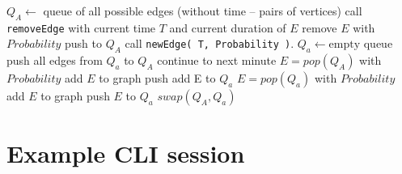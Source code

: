 \documentclass[11pt, a4paper]{article}
\newcommand{\pl}[1]{\texttt{#1}} %
\theoremstyle{plain}
\theoremstyle{definition}
\theoremstyle{remark}
\begin{document}
\begin{algorithmic}[1]
    \State $Q_A \leftarrow$ queue of all possible edges (without time -- pairs of vertices)
            \State call \pl{removeEdge} with current time $T$ and current duration of $E$
            \State remove $E$ with $Probability$
             push to $Q_A$ \EndIf
        \EndFor
        \State call \pl{newEdge( T, Probability )}.
        \State $Q_a \leftarrow \text{empty queue}$
                \State push all edges from $Q_a$ to $Q_A$
                \State continue to next minute
            \EndIf
            \State $E = pop( Q_A )$
            \State with $Probability$ add $E$ to graph
             push add E to $Q_a$ \EndIf
                    \State $E = pop( Q_a )$
                    \State with $Probability$ add $E$ to graph
                     push $E$ to $Q_a$ \EndIf
                \EndWhile
            \EndIf
        \EndWhile
        \State $swap( Q_A, Q_a )$ 
    \EndFor
\end{algorithmic}

\section{Example CLI session}
\label{sec:example-cli}

\end{document}
